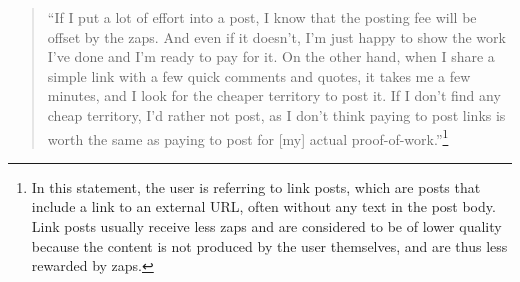 \begin{quote}
``If I put a lot of effort into a post, I know that the posting fee will be offset by the zaps. And even if it doesn't, I'm just happy to show the work I've done and I'm ready to pay for it. On the other hand, when I share a simple link with a few quick comments and quotes, it takes me a few minutes, and I look for the cheaper territory to post it. If I don't find any cheap territory, I'd rather not post, as I don't think paying to post links is worth the same as paying to post for [my] actual proof-of-work.''\footnote{In this statement, the user is referring to link posts, which are posts that include a link to an external URL, often without any text in the post body. Link posts usually receive less zaps and are considered to be of lower quality because the content is not produced by the user themselves, and are thus less rewarded by zaps.}
\end{quote}


